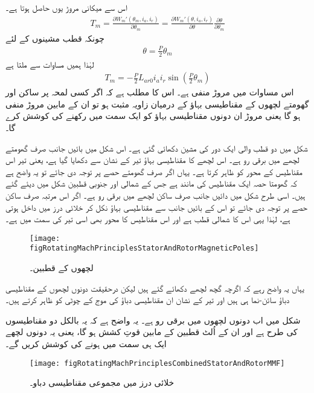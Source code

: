 اس سے میکانی مروڑ  یوں حاصل ہوتا ہے۔
\begin{align}
T_m=\frac{\partial W_m'(\theta_m,i_a,i_r)}{\partial \theta_m}=\frac{\partial W_m'(\theta,i_a,i_r)}{\partial \theta} \frac{\partial \theta}{\partial \theta_m}
\end{align}
چونکہ  قطب مشینوں کے لئے
\begin{align}
\theta=\frac{P}{2} \theta_m
\end{align}
لہٰذا ہمیں مساوات  سے ملتا ہے
\begin{align}
T_m=-\frac{P}{2} L_{ar0} i_a i_r \sin \left(\frac{P}{2} \theta_m\right)
\end{align}
اس مساوات میں مروڑ  منفی ہے۔ اس کا مطلب ہے کہ اگر کسی لمحہ پر ساکن اور گھومتے لچھوں کے مقناطیسی بہاؤ کے درمیان زاویہ مثبت ہو تو ان کے مابین مروڑ منفی ہو گا یعنی مروڑ ان دونوں مقناطیسی بہاؤ کو ایک سمت میں رکھنے کی کوشش کرے گا۔

شکل   میں دو قطب والی ایک دور کی مشین دکھائی گئی ہے۔ اس شکل میں بائیں جانب صرف گھومتے لچھے میں برقی رو ہے۔ اس لچھے کا مقناطیسی بہاؤ تیر کے نشان سے دکھایا گیا ہے، یعنی تیر اس مقناطیس کے محور کو ظاہر کرتا ہے۔ یہاں اگر صرف گھومتے حصے پر توجہ دی جائے تو یہ واضح ہے کہ گھومتا حصہ ایک مقناطیس کی مانند ہے جس کے شمالی اور جنوبی قطبین شکل میں دیئے گئے ہیں۔ اسی طرح شکل میں دائیں جانب صرف ساکن لچھے میں برقی رو ہے۔ اگر اس مرتبہ صرف ساکن حصے پر توجہ دی جائے تو اس کے بائیں جانب سے مقناطیسی بہاؤ نکل کر خلائی درز میں داخل ہوتی ہے، لہٰذا یہی اس کا شمالی قطب ہے اور اس مقناطیس کا محور بھی اسی تیر کی سمت میں ہے۔
\begin{figure}
\centering
\texttt{[image: figRotatingMachPrinciplesStatorAndRotorMagneticPoles]}
\caption{لچھوں کے قطبین۔}
\label{شکل_گھومتے_مشین_لچھوں_کی_قطبین}
\end{figure}

یہاں یہ واضح رہے کہ اگرچہ گچھ لچھے دکھائے گئے ہیں  لیکن درحقیقت دونوں لچھوں کے مقناطیسی دباؤ سائن-نما ہی ہیں اور تیر کے نشان ان مقناطیسی دباؤ کی موج کے چوٹی کو ظاہر کرتے ہیں۔

شکل   میں اب دونوں لچھوں میں برقی رو ہے۔ یہ واضح ہے کہ یہ بالکل دو مقناطیسوں کی طرح ہے اور ان کے اُلٹ قطبین کے مابین قوتِ کشش ہو گا، یعنی یہ دونوں لچھے ایک ہی سمت میں ہونے کی کوشش کریں گے۔
\begin{figure}
\centering
\texttt{[image: figRotatingMachPrinciplesCombinedStatorAndRotorMMF]}
\caption{خلائی درز میں مجموعی مقناطیسی دباو۔}
\label{شکل_گھومتے_مشین_خلائی_درز_مجموعی_دباو}
\end{figure}

